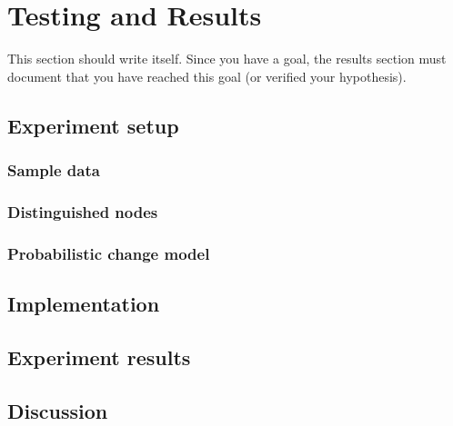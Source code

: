 \chapter{Testing and Results}

This section should write itself. Since you have a goal, the results section must document that you have reached this goal (or verified your hypothesis).

\section{Experiment setup}
\subsection{Sample data}
\subsection{Distinguished nodes}
\subsection{Probabilistic change model}

\section{Implementation}

\section{Experiment results}

\section{Discussion}

